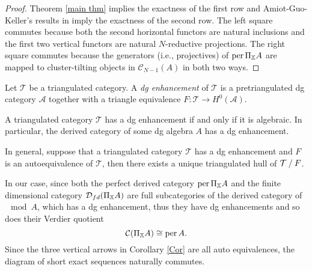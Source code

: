 \begin{proof}
  Theorem \ref{main thm} implies the exactness of the first row
  and Amiot-Guo-Keller's results in \cite{A,Guo,K2}
  imply the exactness of the second row.
  The left square commutes
  because both the second horizontal functors are natural inclusions
  and the first two vertical functors are natural $N$-reductive projections.
  The right square commutes
  because the generators (i.e., projectives) of $\operatorname{per} \Pi_{\mathbb{X}}A$
  are mapped to cluster-tilting objects
  in $\mathcal{C}_{N-1}(A)$ in both two ways.
\end{proof}

\begin{definition}
  Let $\mathcal{T}$ be a triangulated category.
  A \textit{dg enhancement} of $\mathcal{T}$
  is a pretriangulated dg category $\mathcal{A}$
  together with a triangle equivalence
  $F \colon \mathcal{T} \to H^0(\mathcal{A})$.
\end{definition}

\begin{remark}
  A triangulated category $\mathcal{T}$ has a dg enhancement
  if and only if it is algebraic.
  In particular, the derived category of some dg algebra $A$ has a dg enhancement.
\end{remark}

\begin{conjecture}
  In general,
  suppose that a triangulated category $\mathcal{T}$ has a dg enhancement
  and $F$ is an autoequivalence of $\mathcal{T}$,
  then there exists a unique triangulated hull of $\mathcal{T} \mathbin{/} F$.
\end{conjecture}

In our case, since both the perfect derived category $\operatorname{per}\Pi_{\mathbb{X}}A$
and the finite dimensional category $\operatorname{\mathcal{D}}_{fd}(\Pi_{\mathbb{X}}A)$
are full subcategories of the derived category of $\mod A$,
which has a dg enhancement, thus they have dg enhancements
and so does their Verdier quotient
\[ \mathcal{C}(\Pi_{\mathbb{X}}A) \cong \operatorname{per} A. \]
Since the three vertical arrows in Corollary \ref{Cor} are all auto equivalences,
the diagram of short exact sequences naturally commutes.
